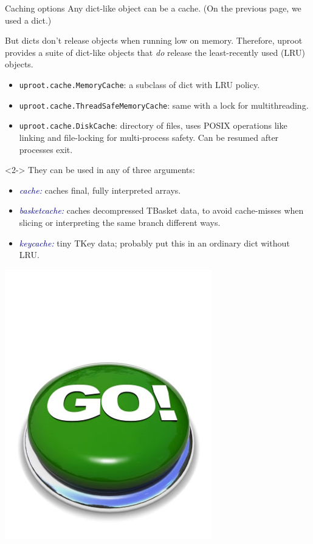 \documentclass[aspectratio=169]{beamer}
\begin{document}
\begin{frame}{Caching options}
\vspace{0.25 cm}
Any dict-like object can be a cache. (On the previous page, we used a dict.)

\vspace{0.25 cm}
But dicts don't release objects when running low on memory. Therefore, uproot provides a suite of dict-like objects that {\it do} release the least-recently used (LRU) objects.

\vspace{0.25 cm}
\begin{itemize}
\item {\tt\small uproot.cache.MemoryCache}: a subclass of dict with LRU policy.
\item {\tt\small uproot.cache.ThreadSafeMemoryCache}: same with a lock for multithreading.
\item {\tt\small uproot.cache.DiskCache}: directory of files, uses POSIX operations like linking and file-locking for multi-process safety. Can be resumed after processes exit.
\end{itemize}

\begin{uncoverenv}<2->
\vspace{0.25 cm}
They can be used in any of three arguments:

\vspace{0.25 cm}
\begin{itemize}
\item \textcolor{darkblue}{\it cache:} caches final, fully interpreted arrays.
\item \textcolor{darkblue}{\it basketcache:} caches decompressed TBasket data, to avoid cache-misses when slicing or interpreting the same branch different ways.
\item \textcolor{darkblue}{\it keycache:} tiny TKey data; probably put this in an ordinary dict without LRU.
\end{itemize}
\end{uncoverenv}

\vspace{-7.7 cm}
\hfill \includegraphics[width=1.5 cm]{safe.png}\hspace{-0.9 cm}
\vspace{7.7 cm}
\end{frame}
\end{document}
